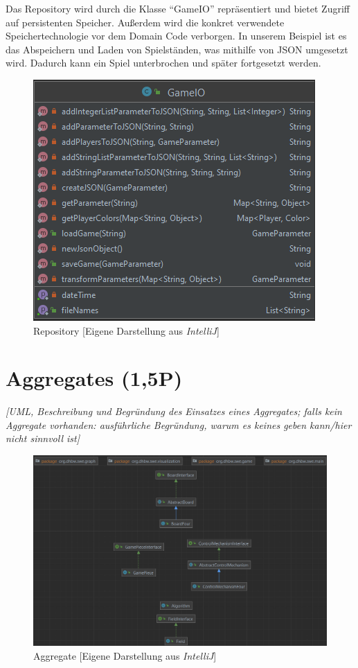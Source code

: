 \vspace{.4cm}

\noindent Das Repository wird durch die Klasse \enquote{GameIO} repräsentiert und bietet Zugriff auf persistenten Speicher. Außerdem wird die konkret verwendete Speichertechnologie vor dem Domain Code verborgen. In unserem Beispiel ist es das Abspeichern und Laden von Spielständen, was mithilfe von JSON umgesetzt wird. Dadurch kann ein Spiel unterbrochen und später fortgesetzt werden.

\begin{figure}[htbp]
\centering
\centerline{\includegraphics[scale=.6]{repo}}
\caption{Repository [Eigene Darstellung aus \emph{IntelliJ}]}
\label{fig:repo}
\end{figure}

\newpage

\section{Aggregates (1,5P)}
\emph{[UML, Beschreibung und Begründung des Einsatzes eines Aggregates; falls kein Aggregate
vorhanden: ausführliche Begründung, warum es keines geben kann/hier nicht sinnvoll ist]}

\begin{figure}[htbp]
\centering
\centerline{\includegraphics[scale=.6]{aggregat}}
\caption{Aggregate [Eigene Darstellung aus \emph{IntelliJ}]}
\label{fig:aggregat}
\end{figure}

